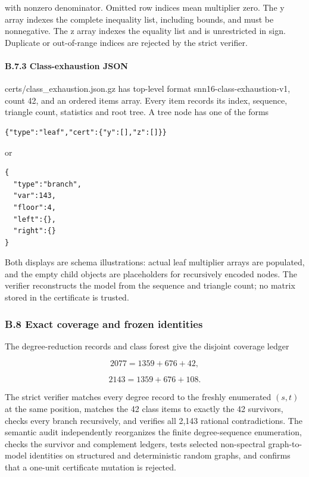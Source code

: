 \documentclass[
  english,
  11pt,
  a4paper,
]{article}
\begin{document}
with nonzero denominator. Omitted row indices mean multiplier zero. The
y array indexes the complete inequality list, including bounds, and must
be nonnegative. The z array indexes the equality list and is
unrestricted in sign. Duplicate or out-of-range indices are rejected by
the strict verifier.

\paragraph{B.7.3 Class-exhaustion
JSON}\label{b.7.3-class-exhaustion-json}

certs/class\_exhaustion.json.gz has top-level format
snn16-class-exhaustion-v1, count 42, and an ordered items array. Every
item records its index, sequence, triangle count, statistics and root
tree. A tree node has one of the forms

\begin{verbatim}
{"type":"leaf","cert":{"y":[],"z":[]}}
\end{verbatim}

or

\begin{verbatim}
{
  "type":"branch",
  "var":143,
  "floor":4,
  "left":{},
  "right":{}
}
\end{verbatim}

Both displays are schema illustrations: actual leaf multiplier arrays
are populated, and the empty child objects are placeholders for
recursively encoded nodes. The verifier reconstructs the model from the
sequence and triangle count; no matrix stored in the certificate is
trusted.

\subsubsection{B.8 Exact coverage and frozen
identities}\label{b.8-exact-coverage-and-frozen-identities}

The degree-reduction records and class forest give the disjoint coverage
ledger

\[
2077=1359+676+42,
\tag{B.46}
\]

\[
2143=1359+676+108.
\tag{B.47}
\]

The strict verifier matches every degree record to the freshly
enumerated \((s,t)\) at the same position, matches the 42 class items to
exactly the 42 survivors, checks every branch recursively, and verifies
all 2,143 rational contradictions. The semantic audit independently
reorganizes the finite degree-sequence enumeration, checks the survivor
and complement ledgers, tests selected non-spectral graph-to-model
identities on structured and deterministic random graphs, and confirms
that a one-unit certificate mutation is rejected.
\end{document}
